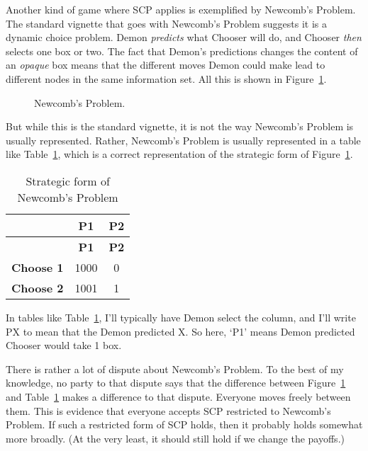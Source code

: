 \documentclass[
  10pt,
  letterpaper,
  DIV=11,
  numbers=noendperiod,
  twoside]{scrartcl}
\begin{document}
Another kind of game where SCP applies is exemplified by Newcomb's
Problem. The standard vignette that goes with Newcomb's Problem suggests
it is a dynamic choice problem. Demon \emph{predicts} what Chooser will
do, and Chooser \emph{then} selects one box or two. The fact that
Demon's predictions changes the content of an \emph{opaque} box means
that the different moves Demon could make lead to different nodes in the
same information set. All this is shown in Figure~\ref{fig-newcomb}.

\begin{figure}


\caption{\label{fig-newcomb}Newcomb's Problem.}

\end{figure}%

But while this is the standard vignette, it is not the way Newcomb's
Problem is usually represented. Rather, Newcomb's Problem is usually
represented in a table like Table~\ref{tbl-newcomb}, which is a correct
representation of the strategic form of Figure~\ref{fig-newcomb}.
\newpage

\begin{longtable}[]{@{}rcc@{}}
\caption{Strategic form of Newcomb's
Problem}\label{tbl-newcomb}\tabularnewline
\toprule\noalign{}
& \textbf{P1} & \textbf{P2} \\
\midrule\noalign{}
\endfirsthead
\toprule\noalign{}
& \textbf{P1} & \textbf{P2} \\
\midrule\noalign{}
\endhead
\bottomrule\noalign{}
\endlastfoot
\textbf{Choose 1} & 1000 & 0 \\
\textbf{Choose 2} & 1001 & 1 \\
\end{longtable}

In tables like Table~\ref{tbl-newcomb}, I'll typically have Demon select
the column, and I'll write PX to mean that the Demon predicted X. So
here, `P1' means Demon predicted Chooser would take 1 box.

There is rather a lot of dispute about Newcomb's Problem. To the best of
my knowledge, no party to that dispute says that the difference between
Figure~\ref{fig-newcomb} and Table~\ref{tbl-newcomb} makes a difference
to that dispute. Everyone moves freely between them. This is evidence
that everyone accepts SCP restricted to Newcomb's Problem. If such a
restricted form of SCP holds, then it probably holds somewhat more
broadly. (At the very least, it should still hold if we change the
payoffs.)
\end{document}
